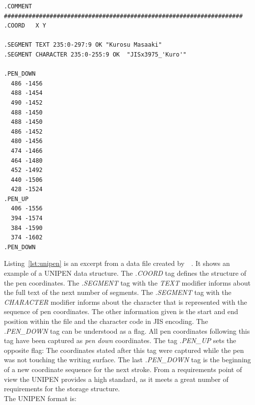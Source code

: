 \begin{xmlcode}
  \begin{lstlisting}[emph={COMMENT,COORD,SEGMENT},emphstyle=\textbf,caption={Demonstration of the \emph{UNIPEN} format},label=lst:unipen]
.COMMENT #################################################################### 
.COORD   X Y

.SEGMENT TEXT 235:0-297:9 OK "Kurosu Masaaki"
.SEGMENT CHARACTER 235:0-255:9 OK  "JISx3975_'Kuro'"

.PEN_DOWN 
  486 -1456 
  488 -1454 
  490 -1452 
  488 -1450 
  488 -1450 
  486 -1452 
  480 -1456 
  474 -1466 
  464 -1480 
  452 -1492 
  440 -1506 
  428 -1524
.PEN_UP 
  406 -1556 
  394 -1574 
  384 -1590 
  374 -1602
.PEN_DOWN 
  \end{lstlisting}
\end{xmlcode}
Listing~\ref{lst:unipen} is an excerpt from a data file created 
by~~\citeyear{Unipen}. It shows an example of a UNIPEN data structure.
The \emph{.COORD} tag defines the structure of the pen coordinates. 
The \emph{.SEGMENT} tag with the \emph{TEXT} modifier informs about the
full text of the next number of segments. The \emph{.SEGMENT} tag with the
\emph{CHARACTER} modifier informs about the character that is represented
with the sequence of pen coordinates. The other information given is the
start and end position within the file and the character code in JIS encoding.
The \emph{.PEN\_DOWN} tag can be understood as a flag. All pen coordinates 
following this tag have been captured as \emph{pen down} coordinates.
The tag \emph{.PEN\_UP} sets the opposite flag: The coordinates stated after 
this tag were captured while the pen was not touching the writing surface.
The last \emph{.PEN\_DOWN} tag is the beginning of a new coordinate sequence
for the next stroke. From a requirements point of view the UNIPEN provides a
high standard, as it meets a great number of requirements for the storage 
structure.\\
The UNIPEN format is:
